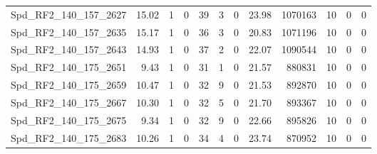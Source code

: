 \begin{longtable}[c]{@{}lrrrrrrrrrrr@{}}
Spd\_RF2\_140\_157\_2627      & 15.02                  & 1                       & 0                       & 39                     & 3                       & 0                       & 23.98                   & 1070163                  & 10                       & 0                        & 0                        \\
Spd\_RF2\_140\_157\_2635      & 15.17                  & 1                       & 0                       & 36                     & 3                       & 0                       & 20.83                   & 1071196                  & 10                       & 0                        & 0                        \\
Spd\_RF2\_140\_157\_2643      & 14.93                  & 1                       & 0                       & 37                     & 2                       & 0                       & 22.07                   & 1090544                  & 10                       & 0                        & 0                        \\
Spd\_RF2\_140\_175\_2651      & 9.43                   & 1                       & 0                       & 31                     & 1                       & 0                       & 21.57                   & 880831                   & 10                       & 0                        & 0                        \\
Spd\_RF2\_140\_175\_2659      & 10.47                  & 1                       & 0                       & 32                     & 9                       & 0                       & 21.53                   & 892870                   & 10                       & 0                        & 0                        \\
Spd\_RF2\_140\_175\_2667      & 10.30                  & 1                       & 0                       & 32                     & 5                       & 0                       & 21.70                   & 893367                   & 10                       & 0                        & 0                        \\
Spd\_RF2\_140\_175\_2675      & 9.34                   & 1                       & 0                       & 32                     & 9                       & 0                       & 22.66                   & 895826                   & 10                       & 0                        & 0                        \\
Spd\_RF2\_140\_175\_2683      & 10.26                  & 1                       & 0                       & 34                     & 4                       & 0                       & 23.74                   & 870952                   & 10                       & 0                        & 0                        \\

\end{longtable}

